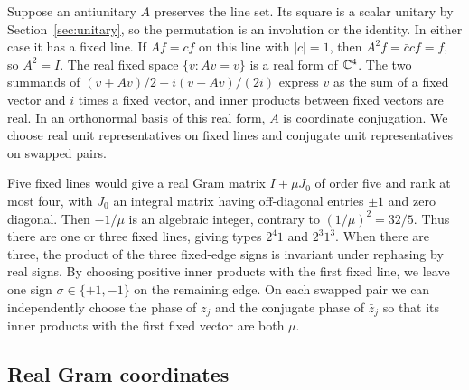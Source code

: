 Suppose an antiunitary $A$ preserves the line set. Its square is a scalar unitary by Section~\ref{sec:unitary}, so the permutation is an involution or the identity. In either case it has a fixed line. If $Af=c f$ on this line with $|c|=1$, then $A^2 f=\bar c c f=f$, so $A^2=I$. The real fixed space $\{v:Av=v\}$ is a real form of $\mathbb C^4$. The two summands of $(v+Av)/2+i(v-Av)/(2i)$ express $v$ as the sum of a fixed vector and $i$ times a fixed vector, and inner products between fixed vectors are real. In an orthonormal basis of this real form, $A$ is coordinate conjugation. We choose real unit representatives on fixed lines and conjugate unit representatives on swapped pairs.

Five fixed lines would give a real Gram matrix $I+\mu J_0$ of order five and rank at most four, with $J_0$ an integral matrix having off-diagonal entries $\pm1$ and zero diagonal. Then $-1/\mu$ is an algebraic integer, contrary to $(1/\mu)^2=32/5$. Thus there are one or three fixed lines, giving types $2^4 1$ and $2^3 1^3$. When there are three, the product of the three fixed-edge signs is invariant under rephasing by real signs. By choosing positive inner products with the first fixed line, we leave one sign $\sigma\in\{+1,-1\}$ on the remaining edge. On each swapped pair we can independently choose the phase of $z_j$ and the conjugate phase of $\bar z_j$ so that its inner products with the first fixed vector are both $\mu$.

\subsection{Real Gram coordinates}

